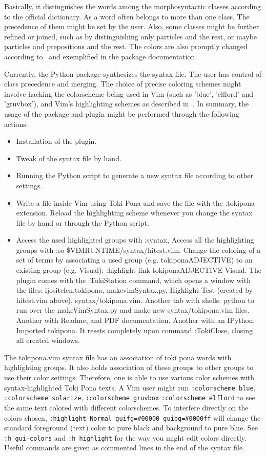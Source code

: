 \documentclass{article}
\newcommand{\tttt}[1]{\texttt{#1}}
\begin{document}
Basically, it distinguishes the words among the morphosyntactic
classes according to the official dictionary.
As a word often belongs to more than one class,
The precedence of them might be set by the user.
Also, some classes might be further refined or joined,
such as by distinguishing only particles and the rest,
or maybe particles and prepositions and the rest.
The colors are also promptly changed according to~\cite{vimArt}
and exemplified in the package documentation.

Currently, the Python package synthesizes the
syntax file.
The user has control of class precedence and
merging.
The choice of precise coloring schemes
might involve hacking the colorscheme being
used in Vim (such as 'blue', 'elflord' and 'gruvbox'),
and Vim's highlighting schemes as described in~\cite{vimArt}.
In summary,
the usage of the package and plugin might be performed
through the following actions:
\begin{itemize}
  \item Installation of the plugin.
  \item Tweak of the syntax file by hand.
  \item Running the Python script to generate a new syntax file
    according to other settings.
  \item Write a file inside Vim using Toki Pona and save
    the file with the .tokipona extension.
    Reload the highlighting scheme whenever you
    change the syntax file by hand or through the Python script.
  \item Access the used highlighted groups with :syntax,
    Access all the highlighting groups with :so \$VIMRUNTIME/syntax/hitest.vim.
    Change the coloring of a set of terms by associating
    a used group (e.g. tokiponaADJECTIVE) to an existing group (e.g. Visual):
    :highlight link tokiponaADJECTIVE Visual.
    The plugin comes with the :TokiStation command, which opens a window with
    the files: ijositelen.tokipona, makevimSyntax.py, Highlight Test (created by hitest.vim above), syntax/tokipona.vim.
    Another tab with shells: python to run over the makeVimSyntax.py and make new syntax/tokipona.vim files. Another with Readme, and PDF documentation. Another with an IPython.
    Imported tokipona. It resets completely upon command :TokiClose, closing all created windows.
\end{itemize}

The tokipona.vim syntax file has an association of toki pona
words with highlighting groups.
It also holds association of these groups to other groups
to use their color settings.
Therefore, one is able to use various color schemes
with syntax-highlighted Toki Pona texts.
A Vim user might run \tttt{:colorscheme blue},
\tttt{:colorscheme solarize}, \tttt{:colorscheme gruvbox}
\tttt{:colorscheme elflord} to see the same text colored
with different colorschemes.
To interfere directly on the colors chosen,
\tttt{:highlight Normal guifg=\#00000 guibg=\#0000ff}
will change the standard foreground (text) color to pure black
and background to pure blue.
See \tttt{:h gui-colors} and \tttt{:h highlight}
for the way you might edit colors directly.
Useful commands are given as commented lines
in the end of the syntax file.
\end{document}
